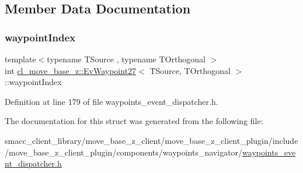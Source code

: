 \subsection{Member Data Documentation}
\mbox{\label{structcl__move__base__z_1_1EvWaypoint27_a767a45932a723b597f00c9fd13cd1cc3}} 
\subsubsection{\texorpdfstring{waypoint\+Index}{waypointIndex}}
{\footnotesize\ttfamily template$<$typename T\+Source , typename T\+Orthogonal $>$ \\
int \hyperlink{structcl__move__base__z_1_1EvWaypoint27}{cl\+\_\+move\+\_\+base\+\_\+z\+::\+Ev\+Waypoint27}$<$ T\+Source, T\+Orthogonal $>$\+::waypoint\+Index}



Definition at line 179 of file waypoints\+\_\+event\+\_\+dispatcher.\+h.



The documentation for this struct was generated from the following file\+:\begin{DoxyCompactItemize}
\item 
smacc\+\_\+client\+\_\+library/move\+\_\+base\+\_\+z\+\_\+client/move\+\_\+base\+\_\+z\+\_\+client\+\_\+plugin/include/move\+\_\+base\+\_\+z\+\_\+client\+\_\+plugin/components/waypoints\+\_\+navigator/\hyperlink{waypoints__event__dispatcher_8h}{waypoints\+\_\+event\+\_\+dispatcher.\+h}\end{DoxyCompactItemize}
